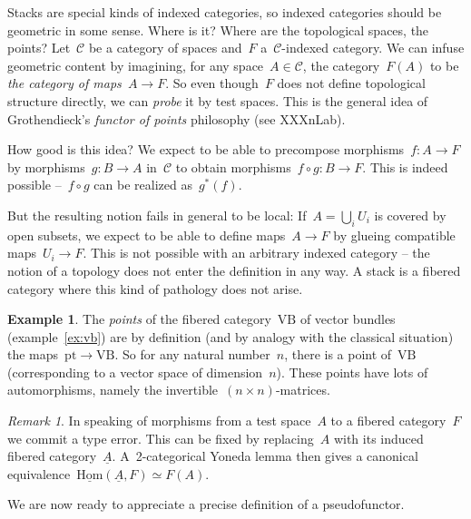 \documentclass[a4paper,english,12pt]{scrartcl}
\theoremstyle{definition}
\newtheorem{ex}[defn]{Example}
\theoremstyle{plain}
\theoremstyle{remark}
\newtheorem{rem}[defn]{Remark}
\newcommand{\C}{\mathcal{C}}
\renewcommand{\_}{\mathpunct{.}\,}
\newcommand{\?}{\,{:}\,}
\newcommand{\VB}{\mathrm{VB}}
\newcommand{\pt}{\mathrm{pt}}
\newcommand{\Hom}{\underline{\mathrm{Hom}}}
\newcommand{\ul}[1]{\underline{#1}}
\begin{document}
Stacks are special kinds of indexed categories, so indexed categories should
be geometric in some sense. Where is it? Where are the topological spaces, the
points? Let~$\C$ be a category of spaces and~$F$ a~$\C$-indexed category. We
can infuse geometric content by imagining, for any space~$A \in \C$, the
category~$F(A)$ to be \emph{the category of maps~$A \to F$}. So even though~$F$
does not define topological structure directly, we can \emph{probe} it by test
spaces. This is the general idea of Grothendieck's \emph{functor of points}
philosophy (see XXXnLab).

How good is this idea? We expect to be able to precompose morphisms~$f : A \to F$
by morphisms~$g : B \to A$ in~$\C$ to obtain morphisms~$f \circ g : B \to F$.
This is indeed possible --~$f \circ g$ can be realized as~$g^*(f)$.

But the resulting notion fails in general to be local: If~$A = \bigcup_i U_i$
is covered by open subsets, we expect to be able to define maps~$A \to F$ by
glueing compatible maps~$U_i \to F$. This is not possible with an arbitrary
indexed category -- the notion of a topology does not enter the definition in
any way. A stack is a fibered category where this kind of pathology does not
arise.

\begin{ex}The \emph{points} of the fibered category~$\VB$ of vector bundles
(example~\ref{ex:vb}) are by definition (and by analogy with the classical
situation) the maps~$\pt \to \VB$. So for any natural number~$n$, there is a point
of~$\VB$ (corresponding to a vector space of dimension~$n$). These points
have lots of automorphisms, namely the invertible~$(n \times n)$-matrices.
\end{ex}

\begin{rem}In speaking of morphisms from a test space~$A$ to a fibered
category~$F$ we commit a type error. This can be fixed by replacing~$A$ with
its induced fibered category~$\ul{A}$. A~2-categorical Yoneda lemma then gives
a canonical equivalence~$\Hom(\ul{A},F) \simeq F(A)$.
\end{rem}

We are now ready to appreciate a precise definition of a pseudofunctor.
\end{document}
